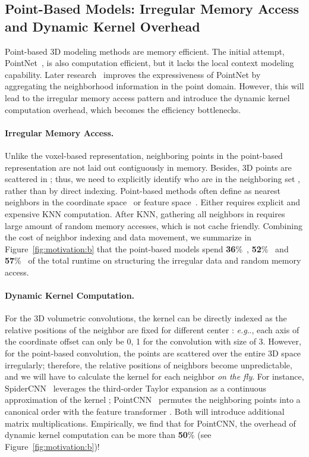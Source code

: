 \documentclass{article}
\makeatletter
\newcommand{\fig}[1]{Figure~\ref{#1}}
\DeclareRobustCommand\onedot{\futurelet\@let@token\@onedot}
\def\@onedot{\ifx\@let@token.\else.\null\fi\xspace}
\def\eg{\emph{e.g}\onedot} \def\Eg{\emph{E.g}\onedot}
\newcommand{\myparagraph}[1]{\vspace{-6pt}\paragraph{#1}}
\makeatother
\begin{document}
\subsection{Point-Based Models: Irregular Memory Access and Dynamic Kernel Overhead}

Point-based 3D modeling methods are memory efficient. The initial attempt, PointNet~\cite{Qi:2017vq}, is also computation efficient, but it lacks the local context modeling capability. Later research~\cite{Qi:2017tf,Li:2018tp,Wang:2018dg,Xu:2018sp} improves the expressiveness of PointNet by aggregating the neighborhood information in the point domain. However, this will lead to the irregular memory access pattern and introduce the dynamic kernel computation overhead, which becomes the efficiency bottlenecks.

\myparagraph{Irregular Memory Access.}

Unlike the voxel-based representation, neighboring points  in the point-based representation are not laid out contiguously in memory. Besides, 3D points are scattered in ; thus, we need to explicitly identify who are in the neighboring set , rather than by direct indexing. Point-based methods often define  as nearest neighbors in the coordinate space~\cite{Li:2018tp,Xu:2018sp} or feature space~\cite{Wang:2018dg}. Either requires explicit and expensive KNN computation. After KNN, gathering all neighbors  in  requires large amount of random memory accesses, which is not cache friendly. Combining the cost of neighbor indexing and data movement, we summarize in \fig{fig:motivation:b} that the point-based models spend \textbf{36}\%~\cite{Li:2018tp}, \textbf{52}\%~\cite{Wang:2018dg} and \textbf{57}\%~\cite{Xu:2018sp} of the total runtime on structuring the irregular data and random memory access.

\myparagraph{Dynamic Kernel Computation.}

For the 3D volumetric convolutions, the kernel  can be directly indexed as the relative positions of the neighbor  are fixed for different center : \eg, each axis of the coordinate offset  can only be 0, 1 for the convolution with size of 3. However, for the point-based convolution, the points are scattered over the entire 3D space irregularly; therefore, the relative positions of neighbors become unpredictable, and we will have to calculate the kernel  for each neighbor  \textit{on the fly}. For instance, SpiderCNN~\cite{Xu:2018sp} leverages the third-order Taylor expansion as a continuous approximation of the kernel ; PointCNN~\cite{Li:2018tp} permutes the neighboring points into a canonical order with the feature transformer . Both will introduce additional matrix multiplications. Empirically, we find that for PointCNN, the overhead of dynamic kernel computation can be more than \textbf{50}\% (see \fig{fig:motivation:b})!
\end{document}
